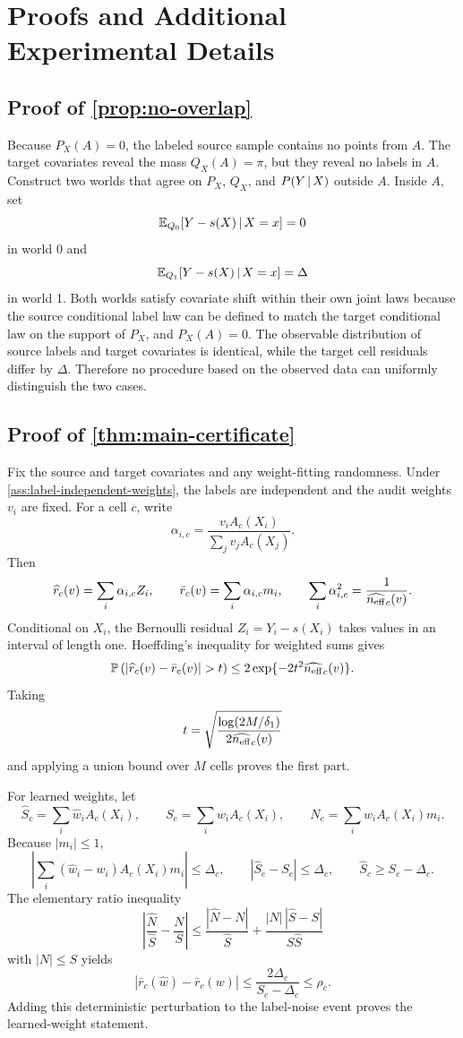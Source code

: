 \section{Proofs and Additional Experimental Details}

\subsection{Proof of \cref{prop:no-overlap}}

Because \(P_X(A)=0\), the labeled source sample contains no points from \(A\). The target covariates reveal the mass \(Q_X(A)=\pi\), but they reveal no labels in \(A\). Construct two worlds that agree on \(P_X\), \(Q_X\), and \(P(Y\,|\, X)\) outside \(A\). Inside \(A\), set
\[
\mathbb{E}_{Q_0}[Y-s(X)\,|\, X=x]=0
\]
in world 0 and
\[
\mathbb{E}_{Q_1}[Y-s(X)\,|\, X=x]=\Delta
\]
in world 1. Both worlds satisfy covariate shift within their own joint laws because the source conditional label law can be defined to match the target conditional law on the support of \(P_X\), and \(P_X(A)=0\). The observable distribution of source labels and target covariates is identical, while the target cell residuals differ by \(\Delta\). Therefore no procedure based on the observed data can uniformly distinguish the two cases.

\subsection{Proof of \cref{thm:main-certificate}}

Fix the source and target covariates and any weight-fitting randomness. Under \cref{ass:label-independent-weights}, the labels are independent and the audit weights \(v_i\) are fixed. For a cell \(c\), write
\[
\alpha_{i,c}
=
\frac{v_iA_c(X_i)}{\sum_jv_jA_c(X_j)} .
\]
Then
\[
\widehat r_c(v)=\sum_i\alpha_{i,c}Z_i,
\qquad
\bar r_c(v)=\sum_i\alpha_{i,c}m_i,
\qquad
\sum_i\alpha_{i,c}^2=\frac{1}{\widehat{n_{\mathrm{eff}}}_c(v)}.
\]
Conditional on \(X_i\), the Bernoulli residual \(Z_i=Y_i-s(X_i)\) takes values in an interval of length one. Hoeffding's inequality for weighted sums gives
\[
\PP\left(
\left|\widehat r_c(v)-\bar r_c(v)\right|>t
\right)
\le
2\exp\{-2t^2\widehat{\ess}_c(v)\}.
\]
Taking
\[
t=\sqrt{\frac{\log(2M/\delta_1)}{2\widehat{n_{\mathrm{eff}}}_c(v)}}
\]
and applying a union bound over \(M\) cells proves the first part.

For learned weights, let
\[
\widehat S_c=\sum_i\widehat w_iA_c(X_i),
\qquad
S_c=\sum_iw_iA_c(X_i),
\qquad
N_c=\sum_iw_iA_c(X_i)m_i .
\]
Because \(|m_i|\le1\),
\[
\left|
\sum_i(\widehat w_i-w_i)A_c(X_i)m_i
\right|\le\Delta_c,
\qquad
|\widehat S_c-S_c|\le\Delta_c,
\qquad
\widehat S_c\ge S_c-\Delta_c.
\]
The elementary ratio inequality
\[
\left|
\frac{\widehat N}{\widehat S}-\frac{N}{S}
\right|
\le
\frac{|\widehat N-N|}{\widehat S}
+
\frac{|N|\,|\widehat S-S|}{S\widehat S}
\]
with \(|N|\le S\) yields
\[
\left|\bar r_c(\widehat w)-\bar r_c(w)\right|
\le
\frac{2\Delta_c}{S_c-\Delta_c}
\le \rho_c .
\]
Adding this deterministic perturbation to the label-noise event proves the learned-weight statement.

